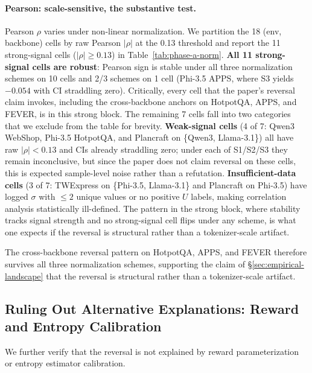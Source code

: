 \paragraph{Pearson: scale-sensitive, the substantive test.}
Pearson $\rho$ varies under non-linear normalization. We
partition the 18 (env, backbone) cells by raw Pearson $|\rho|$
at the 0.13 threshold and report the 11 strong-signal cells
($|\rho|\geq 0.13$) in Table~\ref{tab:phase-a-norm}.
\textbf{All 11 strong-signal cells are robust}: Pearson sign is
stable under all three normalization schemes on 10 cells and
2/3 schemes on 1 cell (Phi-3.5 APPS, where S3 yields $-0.054$
with CI straddling zero). Critically, every cell that the
paper's reversal claim invokes, including the cross-backbone
anchors on HotpotQA, APPS, and FEVER, is in this strong block.
The remaining 7 cells fall into two categories that we exclude
from the table for brevity. \textbf{Weak-signal cells} (4 of 7:
Qwen3 WebShop, Phi-3.5 HotpotQA, and Plancraft on \{Qwen3,
Llama-3.1\}) all have raw $|\rho|<0.13$ and CIs already
straddling zero; under each of S1/S2/S3 they remain
inconclusive, but since the paper does not claim reversal on
these cells, this is expected sample-level noise rather than a
refutation. \textbf{Insufficient-data cells} (3 of 7: TWExpress
on \{Phi-3.5, Llama-3.1\} and Plancraft on Phi-3.5) have logged
$\sigma$ with $\leq 2$ unique values or no positive $U$ labels,
making correlation analysis statistically ill-defined. The
pattern in the strong block, where stability tracks signal
strength and no strong-signal cell flips under any scheme, is
what one expects if the reversal is structural rather than a
tokenizer-scale artifact.



The cross-backbone reversal pattern on HotpotQA, APPS, and FEVER
therefore survives all three normalization schemes, supporting
the claim of \S\ref{sec:empirical-landscape} that the reversal
is structural rather than a tokenizer-scale artifact.

\subsection{Ruling Out Alternative Explanations: Reward and
            Entropy Calibration}
\label{app:reversal-alternatives}

We further verify that the reversal is not explained by reward
parameterization or entropy estimator calibration.


